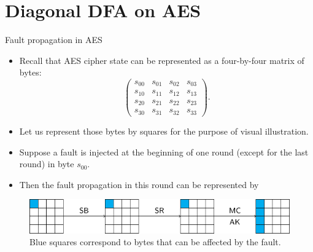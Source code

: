 \section{Diagonal DFA on AES}
\begin{frame}{\VideoName}
    \tableofcontents[currentsection]
\end{frame}

\begin{frame}{Fault propagation in AES}
    \begin{itemize}
        \item Recall that AES cipher state can be represented as a four-by-four matrix of bytes:
\begin{equation*}
    \begin{pmatrix}
    s_{00} & s_{01} & s_{02} & s_{03}\\
    s_{10} & s_{11} & s_{12} & s_{13}\\
    s_{20} & s_{21} & s_{22} & s_{23}\\
    s_{30} & s_{31} & s_{32} & s_{33}
    \end{pmatrix}.
\end{equation*}
        \item Let us represent those bytes by squares for the purpose of visual illustration.
        \item Suppose a fault is injected at the beginning of one round (except for the last round) in byte $s_{00}$.
        \item Then the fault propagation in this round can be represented by
    \end{itemize}
\begin{figure}
    \centering
    \includegraphics{fig/AES_Fault_Diagnol_Attack_Round8_00.pdf}
    \caption{
    Blue squares correspond to bytes that can be affected by the fault.}
\end{figure}
\end{frame}

